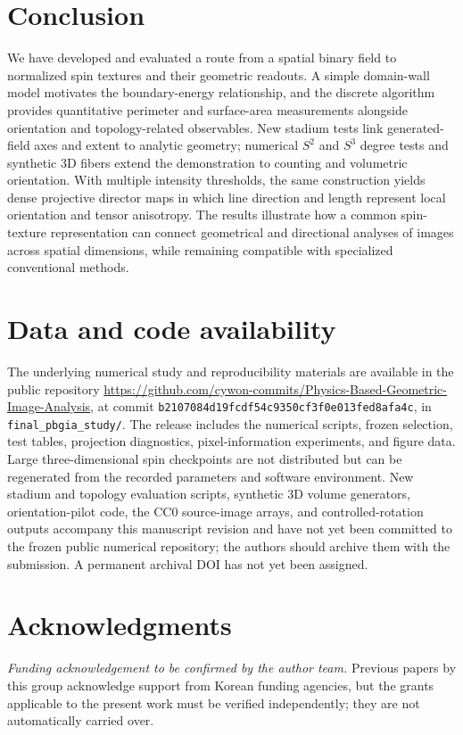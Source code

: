 \documentclass[11pt,a4paper]{article}
\begin{document}
\section{Conclusion}\label{sec:conclusion}
We have developed and evaluated a route from a spatial binary field to normalized spin textures and their geometric readouts. A simple domain-wall model motivates the boundary-energy relationship, and the discrete algorithm provides quantitative perimeter and surface-area measurements alongside orientation and topology-related observables. New stadium tests link generated-field axes and extent to analytic geometry; numerical $S^2$ and $S^3$ degree tests and synthetic 3D fibers extend the demonstration to counting and volumetric orientation. With multiple intensity thresholds, the same construction yields dense projective director maps in which line direction and length represent local orientation and tensor anisotropy. The results illustrate how a common spin-texture representation can connect geometrical and directional analyses of images across spatial dimensions, while remaining compatible with specialized conventional methods.

\section*{Data and code availability}
The underlying numerical study and reproducibility materials are available in the public repository \url{https://github.com/cywon-commits/Physics-Based-Geometric-Image-Analysis}, at commit \texttt{b2107084d19fcdf54c9350cf3f0e013fed8afa4c}, in \texttt{final\_pbgia\_study/}. The release includes the numerical scripts, frozen selection, test tables, projection diagnostics, pixel-information experiments, and figure data. Large three-dimensional spin checkpoints are not distributed but can be regenerated from the recorded parameters and software environment. New stadium and topology evaluation scripts, synthetic 3D volume generators, orientation-pilot code, the CC0 source-image arrays, and controlled-rotation outputs accompany this manuscript revision and have not yet been committed to the frozen public numerical repository; the authors should archive them with the submission. A permanent archival DOI has not yet been assigned.

\section*{Acknowledgments}
\emph{Funding acknowledgement to be confirmed by the author team.} Previous papers by this group acknowledge support from Korean funding agencies, but the grants applicable to the present work must be verified independently; they are not automatically carried over.
\end{document}
